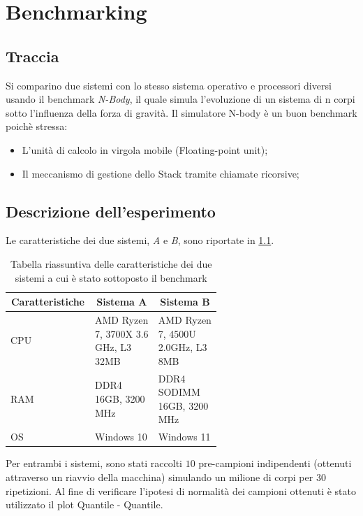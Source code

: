 \chapter{Benchmarking}


\section{Traccia}
 Si comparino due sistemi con lo stesso sistema operativo e processori diversi usando il benchmark \textit{N-Body}, il quale simula l'evoluzione di un sistema di n corpi sotto l'influenza della forza di gravità.
 Il simulatore N-body è un buon benchmark poichè stressa:

\begin{itemize}
    \item L'unità di calcolo in virgola mobile (Floating-point unit);
    \item Il meccanismo di gestione dello Stack tramite chiamate ricorsive;
\end{itemize}

\section{Descrizione dell'esperimento}
Le caratteristiche dei due sistemi, \textit{A} e \textit{B}, sono riportate in \cref{tab:bench_specs}.

\begin{table}
\centering
    \begin{tabular}{|l|p{0.3\linewidth}|p{0.3\linewidth} |}
    \hline
    \multicolumn{1}{|c|}{\textbf{Caratteristiche}} &
    \multicolumn{1}{c|}{\textbf{Sistema A}} & 
    \multicolumn{1}{c|}{\textbf{Sistema B}}  \tabularnewline \hline

CPU & AMD Ryzen 7, 3700X 3.6 GHz, L3 32MB & AMD Ryzen 7, 4500U 2.0GHz, L3 8MB \tabularnewline \hline

RAM & DDR4 16GB, 3200 MHz & DDR4 SODIMM 16GB, 3200 MHz \tabularnewline \hline

OS & Windows 10 & Windows 11 \tabularnewline \hline
\end{tabular}
\caption{Tabella riassuntiva delle caratteristiche dei due sistemi a cui è stato sottoposto il benchmark}
\label{tab:bench_specs}
\end{table}

Per entrambi i sistemi, sono stati raccolti $10$ pre-campioni indipendenti (ottenuti attraverso un riavvio della macchina) simulando un milione di corpi per $30$ ripetizioni.
Al fine di verificare l'ipotesi di normalità dei campioni ottenuti è stato utilizzato il plot Quantile - Quantile.

